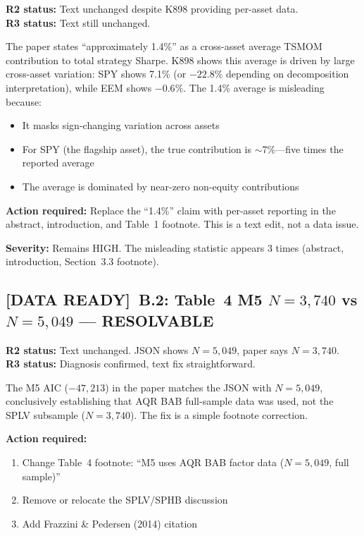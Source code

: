 \documentclass[12pt,a4paper]{article}
\newcommand{\DATAREADY}{\textcolor{fixedblue}{\textbf{[DATA READY]}}}
\begin{document}
\textbf{R2 status:} Text unchanged despite K898 providing per-asset data.\\
\textbf{R3 status:} \textcolor{highsev}{Text still unchanged.}

The paper states ``approximately 1.4\%'' as a cross-asset average TSMOM contribution to total strategy Sharpe. K898 shows this average is driven by large cross-asset variation: SPY shows 7.1\% (or $-22.8\%$ depending on decomposition interpretation), while EEM shows $-0.6\%$. The 1.4\% average is misleading because:

\begin{itemize}[nosep]
\item It masks sign-changing variation across assets
\item For SPY (the flagship asset), the true contribution is $\sim$7\%---five times the reported average
\item The average is dominated by near-zero non-equity contributions
\end{itemize}

\textbf{Action required:} Replace the ``1.4\%'' claim with per-asset reporting in the abstract, introduction, and Table~1 footnote. This is a text edit, not a data issue.

\textbf{Severity:} \textcolor{highsev}{Remains HIGH.} The misleading statistic appears 3 times (abstract, introduction, Section~3.3 footnote).

\bigskip


\subsection{\DATAREADY\ B.2: Table~4 M5 $N = 3{,}740$ vs $N = 5{,}049$ --- RESOLVABLE}

\textbf{R2 status:} Text unchanged. JSON shows $N = 5{,}049$, paper says $N = 3{,}740$.\\
\textbf{R3 status:} \textcolor{fixedblue}{Diagnosis confirmed, text fix straightforward.}

The M5 AIC ($-47{,}213$) in the paper matches the JSON with $N = 5{,}049$, conclusively establishing that AQR BAB full-sample data was used, not the SPLV subsample ($N = 3{,}740$). The fix is a simple footnote correction.

\textbf{Action required:}
\begin{enumerate}[nosep]
\item Change Table~4 footnote: ``M5 uses AQR BAB factor data ($N = 5{,}049$, full sample)''
\item Remove or relocate the SPLV/SPHB discussion
\item Add Frazzini \& Pedersen (2014) citation
\end{enumerate}
\end{document}
